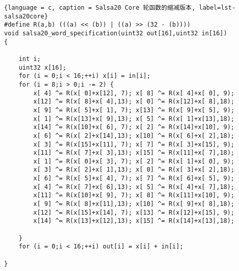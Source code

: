 \begin{lstlisting}{language = c, caption = Salsa20 Core 轮函数的缩减版本, label=lst-salsa20core}
#define R(a,b) (((a) << (b)) | ((a) >> (32 - (b)))) 
void salsa20_word_specification(uint32 out[16],uint32 in[16]) 
{

	int i; 
	uint32 x[16]; 
	for (i = 0;i < 16;++i) x[i] = in[i]; 
	for (i = 8;i > 0;i -= 2) { 
		x[ 4] ^= R(x[ 0]+x[12], 7); x[ 8] ^= R(x[ 4]+x[ 0], 9);
		x[12] ^= R(x[ 8]+x[ 4],13); x[ 0] ^= R(x[12]+x[ 8],18); 
		x[ 9] ^= R(x[ 5]+x[ 1], 7); x[13] ^= R(x[ 9]+x[ 5], 9); 
		x[ 1] ^= R(x[13]+x[ 9],13); x[ 5] ^= R(x[ 1]+x[13],18); 
		x[14] ^= R(x[10]+x[ 6], 7); x[ 2] ^= R(x[14]+x[10], 9); 
		x[ 6] ^= R(x[ 2]+x[14],13); x[10] ^= R(x[ 6]+x[ 2],18); 
		x[ 3] ^= R(x[15]+x[11], 7); x[ 7] ^= R(x[ 3]+x[15], 9); 
		x[11] ^= R(x[ 7]+x[ 3],13); x[15] ^= R(x[11]+x[ 7],18); 
		x[ 1] ^= R(x[ 0]+x[ 3], 7); x[ 2] ^= R(x[ 1]+x[ 0], 9); 
		x[ 3] ^= R(x[ 2]+x[ 1],13); x[ 0] ^= R(x[ 3]+x[ 2],18); 
		x[ 6] ^= R(x[ 5]+x[ 4], 7); x[ 7] ^= R(x[ 6]+x[ 5], 9); 
		x[ 4] ^= R(x[ 7]+x[ 6],13); x[ 5] ^= R(x[ 4]+x[ 7],18); 
		x[11] ^= R(x[10]+x[ 9], 7); x[ 8] ^= R(x[11]+x[10], 9); 
		x[ 9] ^= R(x[ 8]+x[11],13); x[10] ^= R(x[ 9]+x[ 8],18); 
		x[12] ^= R(x[15]+x[14], 7); x[13] ^= R(x[12]+x[15], 9); 
		x[14] ^= R(x[13]+x[12],13); x[15] ^= R(x[14]+x[13],18);

	}
 	for (i = 0;i < 16;++i) out[i] = x[i] + in[i];

}
\end{lstlisting}

